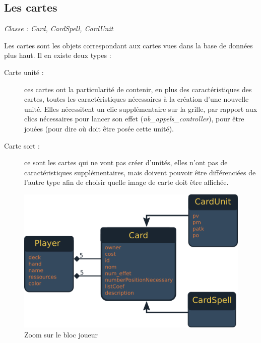 \documentclass[a4paper, titlepage]{livret}
\begin{document}
        \subsection{Les cartes}
          \begin{center}
           \textit{Classe : Card, CardSpell, CardUnit}
          \end{center}
          Les cartes sont les objets correspondant aux cartes vues dans la base de données plus haut. Il en existe deux types :
          \begin{description}
            \item[Carte unité :] ces cartes ont la particularité de contenir, en plus des caractéristiques des cartes, toutes les caractéristiques nécessaires à la création d'une nouvelle unité. Elles nécessitent un clic supplémentaire sur la grille, par rapport aux clics nécessaires pour lancer son effet (\textit{nb\_appels\_controller}), pour être jouées (pour dire où doit être posée cette unité).
            \item[Carte sort :]  ce sont les cartes qui ne vont pas créer d'unités, elles n'ont pas de caractéristiques supplémentaires, mais doivent pouvoir être différenciées de l'autre type afin de choisir quelle image de carte doit être affichée.
          \end{description}
         
         \begin{figure}[th]
          \begin{center}
            \includegraphics[scale=0.4]{Assets/umlBlocCarte.png}
            \caption{Zoom sur le bloc joueur}
            \label{fig7}
          \end{center}
        \end{figure}
             
\end{document}
